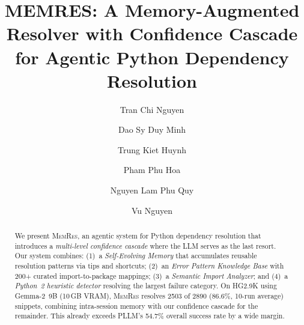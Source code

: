 \documentclass[sigconf,screen]{acmart}
\begin{document}
\title{MEMRES: A Memory-Augmented Resolver with Confidence Cascade for Agentic Python Dependency Resolution}

\author{Tran Chi Nguyen}

\author{Dao Sy Duy Minh}
\authornotemark[1]

\author{Trung Kiet Huynh}
\authornotemark[1]

\author{Pham Phu Hoa}

\author{Nguyen Lam Phu Quy}

\author{Vu Nguyen}

\renewcommand{\shortauthors}{C.~N.~Tran, S.~D.~M.~Dao, T.~K.~Huynh, P.~H.~Pham, L.~P.~Q.~Nguyen, and V.~Nguyen}

\begin{abstract}
We present \textsc{MemRes}, an agentic system for Python dependency resolution that introduces a \emph{multi-level confidence cascade} where the LLM serves as the last resort.
Our system combines: (1)~a \emph{Self-Evolving Memory} that accumulates reusable resolution patterns via tips and shortcuts; (2)~an \emph{Error Pattern Knowledge Base} with 200+ curated import-to-package mappings; (3)~a \emph{Semantic Import Analyzer}; and (4)~a \emph{Python~2 heuristic detector} resolving the largest failure category.
On HG2.9K using Gemma-2~9B (10\,GB VRAM), \textsc{MemRes} resolves \num{2503} of \num{2890} (86.6\%, 10-run average) snippets, combining intra-session memory with our confidence cascade for the remainder.
This already exceeds PLLM's 54.7\% overall success rate by a wide margin.
\end{abstract}
\end{document}
